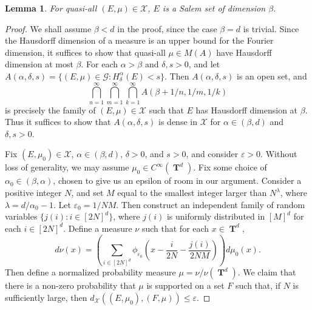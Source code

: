 \documentclass[12pt,reqno]{article}
\DeclareMathOperator{\hausdim}{\dim_{\mathbf{H}}}
\DeclareMathOperator{\fordim}{\dim_{\mathbf{F}}}
\DeclareMathOperator{\TT}{\mathbf{T}}
\newtheorem{lemma}[theorem]{Lemma}
\begin{document}
\begin{lemma}
    For quasi-all $(E,\mu) \in \mathcal{X}$, $E$ is a Salem set of dimension $\beta$.
\end{lemma}
\begin{proof}
    We shall assume $\beta < d$ in the proof, since the case $\beta = d$ is trivial. Since the Hausdorff dimension of a measure is an upper bound for the Fourier dimension, it suffices to show that quasi-all $\mu \in M(A)$ have Hausdorff dimension at most $\beta$. For each $\alpha > \beta$ and $\delta, s > 0$, and let $A(\alpha,\delta,s) = \{ (E,\mu) \in \mathcal{G}: H^\alpha_\delta(E) < s \}$. Then $A(\alpha,\delta,s)$ is an open set, and
    \[ \bigcap_{n = 1}^\infty \bigcap_{m = 1}^\infty \bigcap_{k = 1}^\infty A(\beta + 1/n, 1/m, 1/k) \]
    is precisely the family of $(E,\mu) \in \mathcal{X}$ such that $E$ has Hausdorff dimension at $\beta$.
%
    Thus it suffices to show that $A(\alpha,\delta,s)$ is dense in $\mathcal{X}$ for $\alpha \in (\beta,d)$ and $\delta, s > 0$.

    Fix $(E,\mu_0) \in \mathcal{X}$, $\alpha \in (\beta,d)$, $\delta > 0$, and $s > 0$, and consider $\varepsilon > 0$. Without loss of generality, we may assume $\mu_0 \in C^\infty(\TT^d)$. Fix some choice of $\alpha_0 \in (\beta,\alpha)$, chosen to give us an epsilon of room in our argument. Consider a positive integer $N$, and set $M$ equal to the smallest integer larger than $N^\lambda$, where $\lambda = d/\alpha_0 - 1$. Let $\varepsilon_0 = 1/NM$. Then construct an independent family of random variables $\{ j(i) : i \in [2N]^d \}$, where $j(i)$ is uniformly distributed in $[M]^d$ for each $i \in [2N]^d$. Define a measure $\nu$ such that for each $x \in \TT^d$,
    \[ d\nu(x) = \left( \sum_{i \in [2N]^d} \phi_{\varepsilon_0} \left( x - \frac{i}{2N} - \frac{j(i)}{2NM} \right) \right) d\mu_0(x). \]
    Then define a normalized probability measure $\mu = \nu / \nu(\TT^d)$. We claim that there is a non-zero probability that $\mu$ is supported on a set $F$ such that, if $N$ is sufficiently large, then $d_{\mathcal{X}}((E,\mu_0),(F,\mu)) \leq \varepsilon$.


\end{proof}
\end{document}
